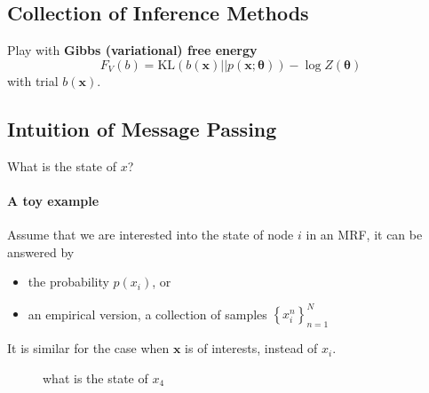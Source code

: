 \subsection{Collection of Inference Methods}
{ 
  \begin{frame}
    \begin{center}
      {\large
        Play with
        \textbf{Gibbs (variational) free energy}
        \begin{equation*}
          F_V(b) = \mathrm{KL}(b( \bm{x}) || p(\bm{x}; \bm{\theta})) - \log{Z(\bm{\theta})}
        \end{equation*}
        with trial $b(\bm{x})$.
      }
    \end{center}
    
  \end{frame}
}


\subsection{Intuition of Message Passing}
\begin{frame}{What is the state of $x$?}
  \framesubtitle{A toy example}
  Assume that we are interested into the state of node $i$ in an MRF, it can be answered by
  \begin{itemize}[label={$\bullet$}]
  \item the probability $p(x_i)$, or
  \item an empirical version, a collection of samples $\left\{ x_i^n \right\}_{n=1}^{N}$
  \end{itemize}
  It is similar for the case when $\bm{x}$ is of interests, instead of $x_i$.
  \begin{figure}
    \captionsetup{labelformat=empty,justification=centering}
    \caption{what is the state of $x_4$}
    
  \end{figure}
  
\end{frame}

